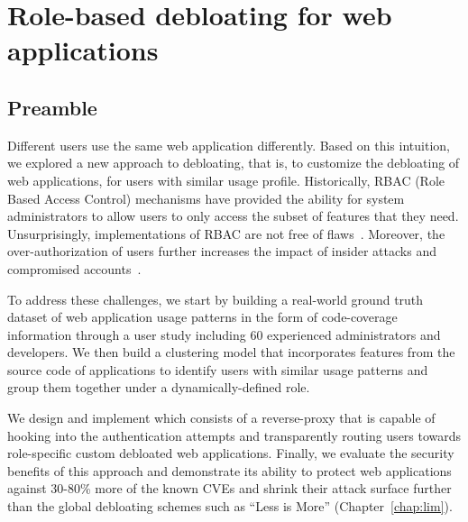 \chapter{Role-based debloating for web applications}
\label{chap:dbltr}

\section*{Preamble}
Different users use the same web application differently. 
Based on this intuition, we explored a new approach to debloating, that is, to customize the debloating of web applications, for users with similar usage profile. 
Historically, RBAC (Role Based Access Control) mechanisms have provided the ability for system administrators to allow users to only access the subset of features that they need. 
Unsurprisingly, implementations of RBAC are not free of flaws~\cite{doupe2011fear, dalton2009nemesis, wpfilemanager}. 
Moreover, the over-authorization of users further increases the impact of insider attacks and compromised accounts~\cite{twitterviphack, oktahack}.

To address these challenges, we start by building a real-world ground truth dataset of web application usage patterns in the form of code-coverage information through a user study including 60 experienced administrators and developers. 
We then build a clustering model that incorporates features from the source code of applications to identify users with similar usage patterns and group them together under a dynamically-defined role. 

We design and implement \dbltr{} which consists of a reverse-proxy that is capable of hooking into the authentication attempts and transparently routing users towards role-specific custom debloated web applications. 
Finally, we evaluate the security benefits of this approach and demonstrate its ability to protect web applications against 30-80\% more of the known CVEs and shrink their attack surface further than the global debloating schemes such as ``Less is More'' (Chapter~\ref{chap:lim}). 







